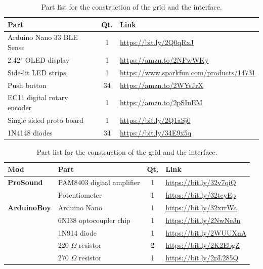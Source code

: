 \documentclass[]{article}
\begin{document}
\begin{appendices}
\begin{table}[h]
                \centering
                \begin{tabular}{|lcl|} %
                    \hline
                    \textbf{Part} & \textbf{Qt.} & \textbf{Link}\\
                    \hline 
                    Arduino Nano 33 BLE Sense & 1 &\url{https://bit.ly/2Q0qRxJ} \\ 
                    2.42" OLED display & 1 & \url{https://amzn.to/2NPwWKy}   \\
                    Side-lit LED strips & 1 & \url{https://www.sparkfun.com/products/14731}   \\
                    Push button & 34 & \url{https://amzn.to/2WYsJrX}\\
                    EC11 digital rotary encoder & 1 & \url{https://amzn.to/2pSIuEM} \\
                    Single sided proto board & 1 & \url{https://bit.ly/2Q1aSj0}\\
                    1N4148 diodes & 34 & \url{https://bit.ly/34E9x5q} \\
                    \hline
            \end{tabular}
                \caption{Part list for the construction of the grid and the interface.}
                \vspace*{1cm}
            \begin{tabular}{|llcl|} %
             \hline
            \textbf{Mod} &\textbf{Part} & \textbf{Qt.} & \textbf{Link}\\
            \hline 
            \textbf{ProSound} & PAM8403 digital amplifier & 1 & \url{https://bit.ly/32v7qiQ}\\
                    & Potentiometer & 1 & \url{https://bit.ly/32tcyEp}\\
            \hline 
            \textbf{ArduinoBoy} & Arduino Nano & 1 & \url{https://bit.ly/32xrrWa} \\
                            & 6NI38 optocoupler chip & 1  & \url{https://bit.ly/2NwNeJn} \\
                          & 1N914 diode & 1  & \url{https://bit.ly/2WUUXnA}\\
                            & 220 $\Omega$ resistor & 2  & \url{https://bit.ly/2K2EbgZ}\\
                            & 270 $\Omega$ resistor & 1  & \url{https://bit.ly/2pL285Q}\\

\end{tabular}
\end{table}
\end{appendices}
\end{document}
